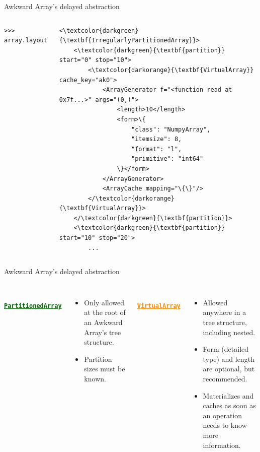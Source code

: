 \documentclass[aspectratio=169]{beamer}
\begin{document}
\begin{frame}[fragile]{Awkward Array's delayed abstraction}
\small
\begin{columns}
\begin{verbatim}
>>> array.layout
\end{verbatim}
\vspace{-0.4 cm}
\begin{Verbatim}[commandchars=\\\{\}]
<\textcolor{darkgreen}{\textbf{IrregularlyPartitionedArray}}>
    <\textcolor{darkgreen}{\textbf{partition}} start="0" stop="10">
        <\textcolor{darkorange}{\textbf{VirtualArray}} cache_key="ak0">
            <ArrayGenerator f="<function read at 0x7f...>" args="(0,)">
                <length>10</length>
                <form>\{
                    "class": "NumpyArray",
                    "itemsize": 8,
                    "format": "l",
                    "primitive": "int64"
                \}</form>
            </ArrayGenerator>
            <ArrayCache mapping="\{\}"/>
        </\textcolor{darkorange}{\textbf{VirtualArray}}>
    </\textcolor{darkgreen}{\textbf{partition}}>
    <\textcolor{darkgreen}{\textbf{partition}} start="10" stop="20">
        ...
\end{Verbatim}
\end{columns}
\end{frame}

\begin{frame}{Awkward Array's delayed abstraction}
\Large
\vspace{0.25 cm}
\begin{columns}[t]
\mbox{ } \hfill \textcolor{darkgreen}{\underline{\tt\textbf{PartitionedArray}}} \hfill \mbox{ }

\vspace{0.25 cm}
\begin{itemize}
\item Only allowed at the root of an Awkward Array's tree structure.

\item Partition sizes must be known.

\end{itemize}

\mbox{ } \hfill \textcolor{darkorange}{\underline{\tt\textbf{VirtualArray}}} \hfill \mbox{ }

\vspace{0.25 cm}
\begin{itemize}
\item Allowed anywhere in a tree structure, including nested.

\item Form (detailed type) and length are optional, but recommended.

\item Materializes and caches as soon as an operation needs to know more information.

\end{itemize}

\end{columns}
\end{frame}
\end{document}
